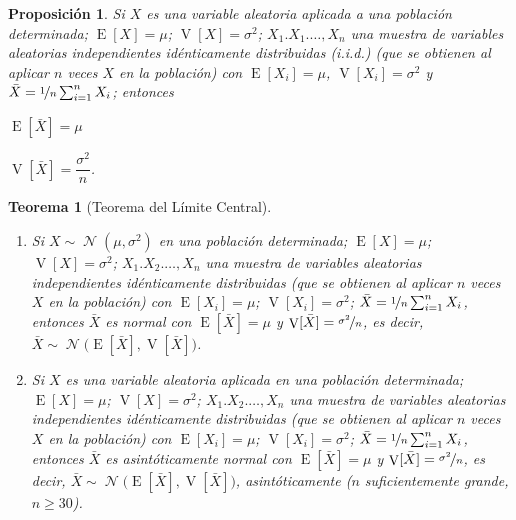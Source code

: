 \documentclass[a5paper,doc,10pt,noapacite]{apa6}
\DeclareMathOperator{\Esp}{E}
\DeclareMathOperator{\Var}{V}
\DeclareMathOperator{\Normal}{\mathcal{N}}
\newtheorem{proposicion}{Proposición}
\newtheorem{teorema}{Teorema}
\begin{document}
{{\begin{proposicion}\label{prop-4.1}
	Si  \(X\) es una variable aleatoria aplicada a una población determinada; \(\Esp[X]=\mu\); \(\Var[X]=\sigma^2\); \(X_1.X_1.\ldots,X_n\) una muestra de variables aleatorias independientes idénticamente distribuidas (i.i.d.) (que se obtienen al aplicar \(n\) veces \(X\) en la población) con \(\Esp[X_i]=\mu\), \(\Var[X_i]=\sigma^2\) y \(\bar{X}=\nicefrac{1}{n}\sum_{i=1}^{n}X_i\); entonces
	\begin{seriate}
		\item \(\Esp[\bar{X}]=\mu\)
		\item \(\Var[\bar{X}]=\dfrac{\sigma^2}{n}\).
	\end{seriate}
\end{proposicion}


\begin{teorema}[Teorema del Límite Central]\quad
	\begin{enumerate}
		\item Si \(X\sim \Normal(\mu,\sigma^2)\) en una población determinada; \(\Esp[X]=\mu\); \(\Var[X]=\sigma^2\); \(X_1.X_2.\ldots, X_n\) una muestra de variables aleatorias independientes idénticamente distribuidas (que se obtienen al aplicar \(n\) veces \(X\) en la población) con \(\Esp[X_i]=\mu\); \(\Var[X_i]=\sigma^2\); \(\bar{X}=\nicefrac{1}{n}\sum_{i=1}^{n}X_i\), entonces \(\bar{X}\) es normal con \(\Esp[\bar{X}]=\mu\) y \(\Var[\bar{X}]=\nicefrac{\sigma^2}{n}\), es decir, \(\bar{X}\sim\Normal\big( \Esp[\bar{X}],\Var[\bar{X}]\big)\).
		
		\item Si \(X\) es una variable aleatoria aplicada en una población determinada; \(\Esp[X]=\mu\); \(\Var[X]=\sigma^2\); \(X_1.X_2.\ldots,X_n\) una muestra de variables aleatorias independientes idénticamente distribuidas (que se obtienen al aplicar \(n\) veces \(X\) en la población) con \(\Esp[X_i]=\mu\); \(\Var[X_i]=\sigma^2\); \(\bar{X}=\nicefrac{1}{n}\sum_{i=1}^{n}X_i\), entonces \(\bar{X}\) es asintóticamente normal con \(\Esp[\bar{X}]=\mu\) y \(\Var[\bar{X}]=\nicefrac{\sigma^2}{n}\), es decir, \(\bar{X}\sim\Normal\big(\Esp[\bar{X}],\Var[\bar{X}]\big)\), asintóticamente (\(n\) suficientemente grande, \(n\geq 30\)).
	\end{enumerate}
\end{teorema}

}}
\end{document}
